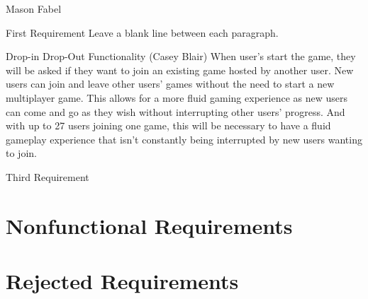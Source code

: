 \documentclass[12pt]{report}
\begin{document}
\begin{section}{Mason Fabel}
\begin{subsection}{First Requirement}
Leave a blank line between each paragraph.
\end{subsection}

\begin{subsection}{Drop-in Drop-Out Functionality (Casey Blair)}
When user’s start the game, they will be asked if they want to join an existing game hosted by another user. New users can join and leave other users’ games without the need to start a new multiplayer game. This allows for a more fluid gaming experience as new users can come and go as they wish without interrupting other users’ progress. And with up to 27 users joining one game, this will be necessary to have a fluid gameplay experience that isn’t constantly being interrupted by new users wanting to join.
\end{subsection}

\begin{subsection}{Third Requirement}
\end{subsection}
\end{section}

\chapter{Nonfunctional Requirements}

\chapter{Rejected Requirements}
\end{document}
